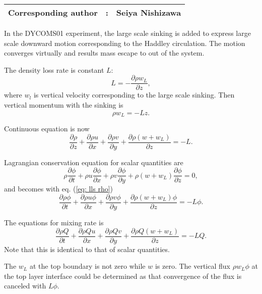 {\bf \Large 
\begin{tabular}{ccc}
\hline
  Corresponding author & : & Seiya Nishizawa\\
\hline
\end{tabular}
}


In the DYCOMS01 experiment, the large scale sinking is added
to express large scale downward motion corresponding to the Haddley circulation.
The motion converges virtually and results mass escape to out of the system.

The density loss rate is constant $L$:
\begin{equation}
  L = -\frac{\partial \rho w_L}{\partial z},
\end{equation}
where $w_l$ is vertical velocity corresponding to the large scale sinking.
Then vertical momentum with the sinking is
\begin{equation}
  \rho w_L = -Lz.
\end{equation}

Continuous equation is now
\begin{equation}
  \frac{\partial \rho}{\partial z}
  + \frac{\partial \rho u}{\partial x}
  + \frac{\partial \rho v}{\partial y}
  + \frac{\partial \rho (w+w_L)}{\partial z}
  = -L.
  \label{eq: lls rho}
\end{equation}

Lagrangian conservation equation for scalar quantities are
\begin{equation}
  \rho\frac{\partial \phi}{\partial t}
  + \rho u\frac{\partial \phi}{\partial x}
  + \rho v\frac{\partial \phi}{\partial y}
  + \rho (w+w_L)\frac{\partial \phi}{\partial z}
  = 0,
\end{equation}
and becomes with eq. (\ref{eq: lls rho})
\begin{equation}
  \frac{\partial \rho\phi}{\partial t}
  + \frac{\partial \rho u \phi}{\partial x}
  + \frac{\partial \rho v \phi}{\partial y}
  + \frac{\partial \rho (w+w_L) \phi}{\partial z}
  = -L\phi.
\end{equation}

The equations for mixing rate is
\begin{equation}
  \frac{\partial \rho Q}{\partial t}
  + \frac{\partial \rho Q u }{\partial x}
  + \frac{\partial \rho Q v}{\partial y}
  + \frac{\partial \rho Q (w+w_L)}{\partial z}
  = -L Q.
\end{equation}
Note that this is identical to that of scalar quantities.

The $w_L$ at the top boundary is not zero while $w$ is zero.
The vertical flux $\rho w_L \phi$ at the top layer interface could be determined as
that convergence of the flux is canceled with $L\phi$.


